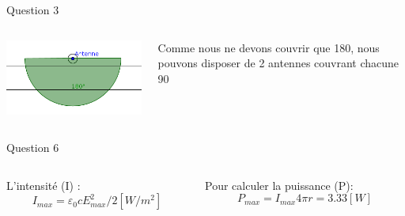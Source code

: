 \documentclass{beamer}
\begin{document}
\begin{frame}{Question 3}
	\begin{columns}
		\begin{column}{0.40\textwidth}
			\begin{center}
	    		\includegraphics[scale=0.9]{question3-2.png}
        		\end{center}
        	\end{column}
        	\begin{column}{0.40\textwidth}
	    Comme nous ne devons couvrir que \unit{180}{\degree}, nous pouvons disposer de 2 antennes couvrant chacune \unit{90}{\degree}
	   
        	\end{column}
        	\end{columns}
\end{frame}

\begin{frame}{Question 6}
	\begin{columns}
		\begin{column}{0.40\textwidth}
			\begin{center}
			L'intensité (I)  : 
			$$I_{max} = \varepsilon_0 c E_{max}^2/2 [W/m^2] $$
	    		
        		\end{center}
        	\end{column}
        	\begin{column}{0.40\textwidth}
			\begin{center}
	    Pour calculer la puissance (P):
	    $$ P_{max} = I_{max}4\pi r = 3.33 [W] $$
	    
        	\end{center}
        	\end{column}
        	\end{columns}
\end{frame}
\end{document}
